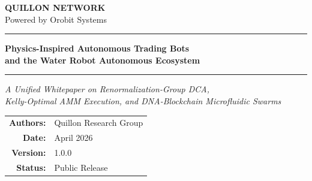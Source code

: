 \documentclass[12pt,a4paper]{article}
\begin{document}

\begin{titlepage}
\begin{center}
\vspace*{2cm}

{\Large\textbf{\textcolor{quillonblue}{QUILLON NETWORK}}}\\[0.4em]
{\small\textcolor{quillongray}{Powered by Orobit Systems}}

\vspace{1.5cm}
\rule{\linewidth}{0.4pt}
\vspace{0.6cm}

{\LARGE\bfseries Physics-Inspired Autonomous Trading Bots\\[0.3em]
and the Water Robot Autonomous Ecosystem}

\vspace{0.4cm}
\rule{\linewidth}{0.4pt}

\vspace{1cm}
{\large\textit{A Unified Whitepaper on Renormalization-Group DCA,\\
Kelly-Optimal AMM Execution, and DNA-Blockchain Microfluidic Swarms}}

\vspace{2cm}

\begin{tabular}{rl}
\textbf{Authors:} & Quillon Research Group \\
\textbf{Date:}    & April 2026 \\
\textbf{Version:} & 1.0.0 \\
\textbf{Status:}  & Public Release \\
\end{tabular}

\vspace{2cm}


\end{center}
\end{titlepage}
\end{document}
